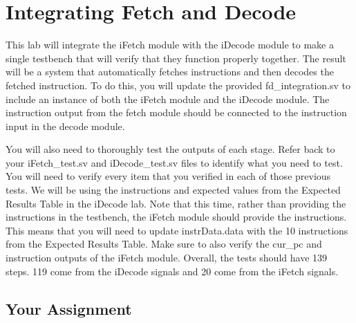 \chapter{Integrating Fetch and Decode}

This lab will integrate the iFetch module with the iDecode module to make a single testbench that will verify that they function properly together.  The result will be a system that automatically fetches instructions and then decodes the fetched instruction.  To do this, you will update the provided fd\_integration.sv to include an instance of both the iFetch module and the iDecode module.  The instruction output from the fetch module should be connected to the instruction input in the decode module.  

You will also need to thoroughly test the outputs of each stage.  Refer back to your iFetch\_test.sv and iDecode\_test.sv files to identify what you need to test.  You will need to verify every item that you verified in each of those previous tests.  We will be using the instructions and expected values from the Expected Results Table in the iDecode lab.  Note that this time, rather than providing the instructions in the testbench, the iFetch module should provide the instructions.  This means that you will need to update instrData.data with the 10 instructions from the Expected Results Table.  Make sure to also verify the cur\_pc and instruction outputs of the iFetch module.  Overall, the tests should have 139 steps.  119 come from the iDecode signals and 20 come from the iFetch signals.


\section{Your Assignment}

